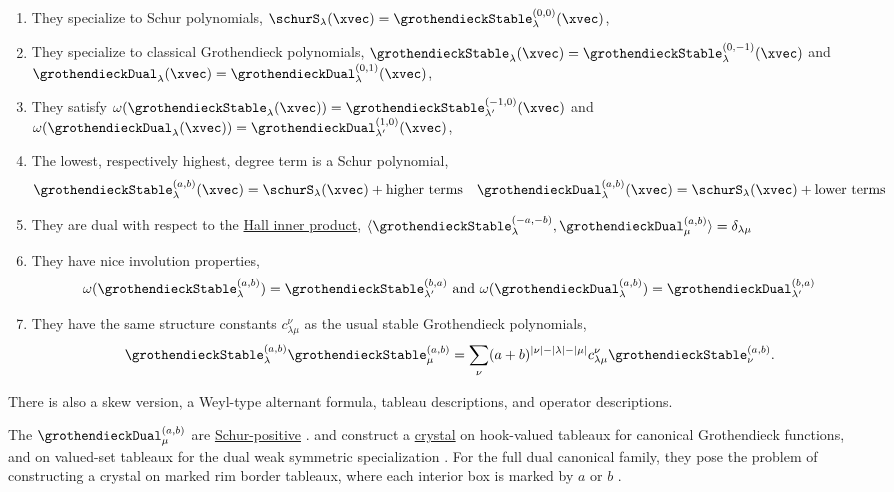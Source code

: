 \begin{enumerate}

\item They specialize to Schur polynomials,
$\schurS_\lambda(\xvec) = \grothendieckStable^{(0,0)}_\lambda(\xvec)$,

\item They specialize to classical Grothendieck polynomials,
$\grothendieckStable_\lambda(\xvec) = \grothendieckStable^{(0,-1)}_\lambda(\xvec)$ and
$\grothendieckDual_\lambda(\xvec) = \grothendieckDual^{(0,1)}_\lambda(\xvec)$,

\item They satisfy
$\omega(\grothendieckStable_\lambda(\xvec)) = \grothendieckStable^{(-1,0)}_{\lambda'}(\xvec)$ and
$\omega(\grothendieckDual_\lambda(\xvec)) = \grothendieckDual^{(1,0)}_{\lambda'}(\xvec)$,

\item The lowest, respectively highest, degree term is a Schur polynomial,
\[
\grothendieckStable^{(a,b)}_\lambda(\xvec) = \schurS_\lambda(\xvec) + \text{higher terms} \quad
\grothendieckDual^{(a,b)}_\lambda(\xvec) = \schurS_\lambda(\xvec) + \text{lower terms}
\]

\item They are dual with respect to the \hyperref[hallInnerProduct]{Hall inner product},
$
\langle \grothendieckStable^{(-a,-b)}_\lambda, \grothendieckDual^{(a,b)}_\mu \rangle = \delta_{\lambda\mu}
$

\item They have nice involution properties,
\[
\omega( \grothendieckStable^{(a,b)}_\lambda ) = \grothendieckStable^{(b,a)}_{\lambda'} \text{ and }
\omega( \grothendieckDual^{(a,b)}_\lambda ) = \grothendieckDual^{(b,a)}_{\lambda'}
\]

\item
They have the same structure constants $c^{\nu}_{\lambda\mu}$ as the usual stable Grothendieck polynomials,
\[
\grothendieckStable^{(a,b)}_\lambda
\grothendieckStable^{(a,b)}_\mu
=
\sum_{\nu} (a+b)^{|\nu|-|\lambda|-|\mu|} c^{\nu}_{\lambda\mu}\grothendieckStable^{(a,b)}_\nu.
\]
\end{enumerate}

There is also a skew version, a Weyl-type alternant formula, tableau descriptions,
and operator descriptions.

The $\grothendieckDual^{(a,b)}_\mu$ are
\hyperref[schurPositiveDefinition]{Schur-positive} \cite{Yeliussizov2017}.
 and  construct a
\hyperref[crystals]{crystal} on hook-valued tableaux for canonical
Grothendieck functions, and on valued-set tableaux for the dual weak
symmetric specialization \cite{HawkesScrimshaw2020}.
For the full dual canonical family, they pose the problem of constructing
a crystal on marked rim border tableaux, where each interior box is marked
by $a$ or $b$ \cite[Sec.~1]{HawkesScrimshaw2020}.

